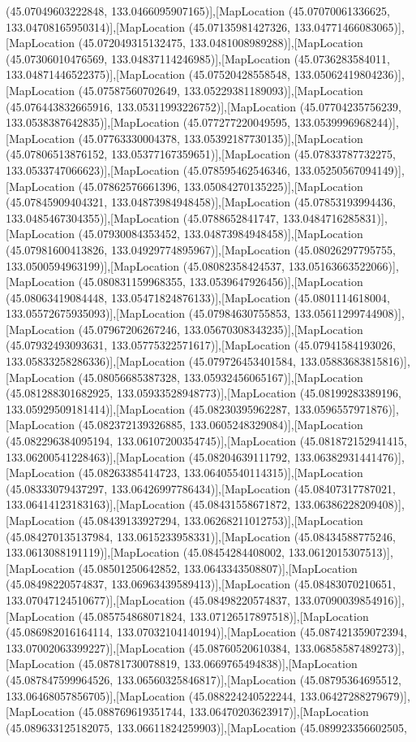 (45.07049603222848, 133.0466095907165)],[MapLocation (45.07070061336625, 133.04708165950314)],[MapLocation (45.07135981427326, 133.04771466083065)],[MapLocation (45.072049315132475, 133.0481008989288)],[MapLocation (45.07306010476569, 133.04837114246985)],[MapLocation (45.0736283584011, 133.04871446522375)],[MapLocation (45.07520428558548, 133.05062419804236)],[MapLocation (45.07587560702649, 133.05229381189093)],[MapLocation (45.076443832665916, 133.05311993226752)],[MapLocation (45.07704235756239, 133.0538387642835)],[MapLocation (45.077277220049595, 133.0539996968244)],[MapLocation (45.07763330004378, 133.05392187730135)],[MapLocation (45.07806513876152, 133.05377167359651)],[MapLocation (45.07833787732275, 133.0533747066623)],[MapLocation (45.078595462546346, 133.05250567094149)],[MapLocation (45.07862576661396, 133.05084270135225)],[MapLocation (45.07845909404321, 133.04873984948458)],[MapLocation (45.07853193994436, 133.0485467304355)],[MapLocation (45.0788652841747, 133.0484716285831)],[MapLocation (45.07930084353452, 133.04873984948458)],[MapLocation (45.07981600413826, 133.04929774895967)],[MapLocation (45.08026297795755, 133.0500594963199)],[MapLocation (45.08082358424537, 133.05163663522066)],[MapLocation (45.080831159968355, 133.0539647926456)],[MapLocation (45.08063419084448, 133.05471824876133)],[MapLocation (45.0801114618004, 133.05572675935093)],[MapLocation (45.07984630755853, 133.05611299744908)],[MapLocation (45.07967206267246, 133.05670308343235)],[MapLocation (45.07932493093631, 133.05775322571617)],[MapLocation (45.07941584193026, 133.05833258286336)],[MapLocation (45.079726453401584, 133.05883683815816)],[MapLocation (45.08056685387328, 133.05932456065167)],[MapLocation (45.081288301682925, 133.05933528948773)],[MapLocation (45.08199283389196, 133.05929509181414)],[MapLocation (45.08230395962287, 133.0596557971876)],[MapLocation (45.082372139326885, 133.0605248329084)],[MapLocation (45.082296384095194, 133.06107200354745)],[MapLocation (45.081872152941415, 133.06200541228463)],[MapLocation (45.08204639111792, 133.06382931441476)],[MapLocation (45.08263385414723, 133.06405540114315)],[MapLocation (45.08333079437297, 133.06426997786434)],[MapLocation (45.08407317787021, 133.06414123183163)],[MapLocation (45.08431558671872, 133.06386228209408)],[MapLocation (45.08439133927294, 133.06268211012753)],[MapLocation (45.084270135137984, 133.0615233958331)],[MapLocation (45.08434588775246, 133.0613088191119)],[MapLocation (45.08454284408002, 133.0612015307513)],[MapLocation (45.08501250642852, 133.0643343508807)],[MapLocation (45.08498220574837, 133.06963439589413)],[MapLocation (45.08483070210651, 133.07047124510677)],[MapLocation (45.08498220574837, 133.07090039854916)],[MapLocation (45.085754868071824, 133.07126517897518)],[MapLocation (45.086982016164114, 133.07032104140194)],[MapLocation (45.087421359072394, 133.07002063399227)],[MapLocation (45.08760520610384, 133.06858587489273)],[MapLocation (45.08781730078819, 133.0669765494838)],[MapLocation (45.087847599964526, 133.06560325846817)],[MapLocation (45.08795364695512, 133.06468057856705)],[MapLocation (45.088224240522244, 133.06427288279679)],[MapLocation (45.088769619351744, 133.06470203623917)],[MapLocation (45.089633125182075, 133.06611824259903)],[MapLocation (45.089923356602505, 